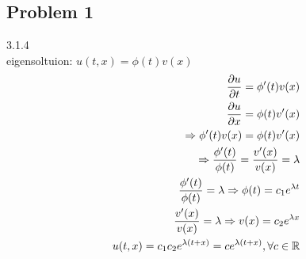 \subsection*{Problem 1}
3.1.4
\\eigensoltuion: $u(t,x)=\phi(t)v(x)$
\begin{align*}{}{}
\pdv{u}{t}=\phi'(t)v(x)\\
\pdv{u}{x}=\phi(t)v'(x)\\
\Rightarrow \phi'(t)v(x)=\phi(t)v'(x)\\
\Rightarrow \frac{\phi'(t)}{\phi(t)}=\frac{v'(x)}{v(x)}=\lambda\\
\frac{\phi'(t)}{\phi(t)}=\lambda \Rightarrow \phi(t)=c_1e^{\lambda t}\\
\frac{v'(x)}{v(x)}=\lambda \Rightarrow v(x)=c_2e^{\lambda x}\\
u(t,x)=c_1c_2e^{\lambda(t+x)}=ce^{\lambda(t+x)},\forall c\in \mathbb{R}\\
\end{align*}
